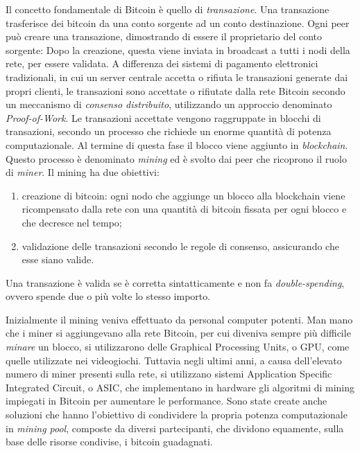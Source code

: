 Il concetto fondamentale di Bitcoin è quello di \emph{transazione}. Una transazione trasferisce dei bitcoin da una conto sorgente ad un conto destinazione. Ogni peer può creare una transazione, dimostrando di essere il proprietario del conto sorgente: Dopo la creazione, questa viene inviata in broadcast a tutti i nodi della rete, per essere validata. A differenza dei sistemi di pagamento elettronici tradizionali, in cui un server centrale accetta o rifiuta le transazioni generate dai propri clienti, le transazioni sono accettate o rifiutate dalla rete Bitcoin secondo un meccanismo di \emph{consenso distribuito}, utilizzando un approccio denominato \emph{Proof-of-Work}. Le transazioni accettate vengono raggruppate in blocchi di transazioni, secondo un processo che richiede un enorme quantità di potenza computazionale. Al termine di questa fase il blocco viene aggiunto in \emph{blockchain}. Questo processo è denominato \emph{mining} ed è svolto dai peer che ricoprono il ruolo di \emph{miner}. Il mining ha due obiettivi:
\begin{enumerate}
	\item creazione di bitcoin: ogni nodo che aggiunge un blocco alla blockchain viene ricompensato dalla rete con una quantità di bitcoin fissata per ogni blocco e che decresce nel tempo;
	\item validazione delle transazioni secondo le regole di consenso, assicurando che esse siano valide.
\end{enumerate}
Una transazione è valida se è corretta sintatticamente e non fa \textit{double-spending}, ovvero spende due o più volte lo stesso importo.
 
Inizialmente il mining veniva effettuato da personal computer potenti. Man mano che i miner si aggiungevano alla rete Bitcoin, per cui diveniva sempre più difficile \emph{minare} un blocco, si utilizzarono delle Graphical Processing Units, o GPU, come quelle utilizzate nei videogiochi. Tuttavia negli ultimi anni, a causa dell'elevato numero di miner presenti sulla rete, si utilizzano sistemi Application Specific Integrated Circuit, o ASIC, che implementano in hardware gli algoritmi di mining impiegati in Bitcoin per aumentare le performance. Sono state create anche soluzioni che hanno l'obiettivo di condividere la propria potenza computazionale in \textit{mining pool}, composte da diversi partecipanti, che dividono equamente, sulla base delle risorse condivise, i bitcoin guadagnati.

